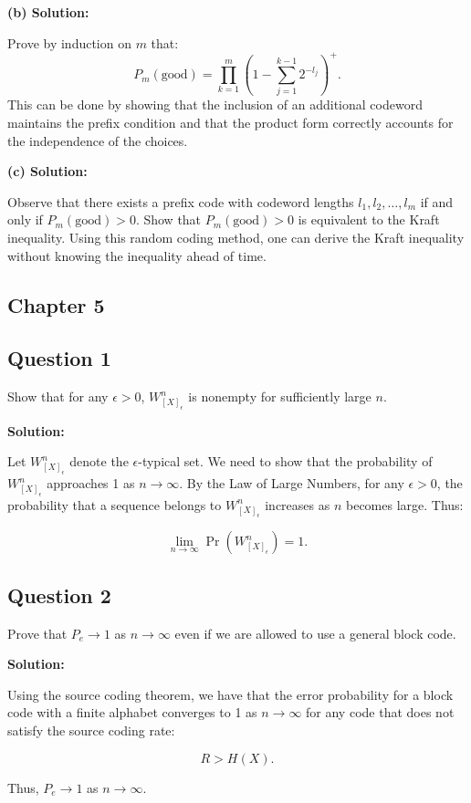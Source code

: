 \documentclass[a4paper,10pt]{article}
\begin{document}
\textbf{(b) Solution:}

Prove by induction on $ m $ that:
$$
P_m(\text{good}) = \prod_{k=1}^{m} \left(1 - \sum_{j=1}^{k-1} 2^{-l_j}\right)^+.
$$
This can be done by showing that the inclusion of an additional codeword maintains the prefix condition and that the product form correctly accounts for the independence of the choices.

\textbf{(c) Solution:}

Observe that there exists a prefix code with codeword lengths $ l_1, l_2, \dots, l_m $ if and only if $ P_m(\text{good}) > 0 $. Show that $ P_m(\text{good}) > 0 $ is equivalent to the Kraft inequality. Using this random coding method, one can derive the Kraft inequality without knowing the inequality ahead of time.

\subsection{Chapter 5}

\subsection*{Question 1}
Show that for any $\epsilon > 0$, $W_{[X]_{\epsilon}}^n$ is nonempty for sufficiently large $n$.

\textbf{Solution:}

Let $W_{[X]_{\epsilon}}^n$ denote the $\epsilon$-typical set. We need to show that the probability of $W_{[X]_{\epsilon}}^n$ approaches 1 as $n \to \infty$. By the Law of Large Numbers, for any $\epsilon > 0$, the probability that a sequence belongs to $W_{[X]_{\epsilon}}^n$ increases as $n$ becomes large. Thus:

$$
\lim_{n \to \infty} \Pr(W_{[X]_{\epsilon}}^n) = 1.
$$

\subsection*{Question 2}
Prove that $P_e \to 1$ as $n \to \infty$ even if we are allowed to use a general block code.

\textbf{Solution:}

Using the source coding theorem, we have that the error probability for a block code with a finite alphabet converges to 1 as $n \to \infty$ for any code that does not satisfy the source coding rate:

$$
R > H(X).
$$

Thus, $P_e \to 1$ as $n \to \infty$.
\end{document}
